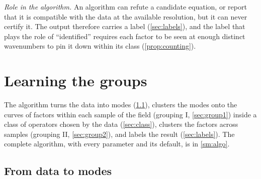 \documentclass[11pt]{article}
\theoremstyle{plain}
\theoremstyle{definition}
\theoremstyle{remark}
\newcommand{\roleinalg}[1]{\par\noindent\emph{Role in the algorithm.} #1\par}
\newcommand{\SMalgo}{\cref{sm:algo}}
\begin{document}
\roleinalg{An algorithm can refute a candidate equation, or report that it is compatible with the data at the available
resolution, but it can never certify it. The output therefore carries a label (\cref{sec:labels}), and the label that
plays the role of ``identified'' requires each factor to be seen at enough distinct wavenumbers to pin it down within
its class (\cref{prop:counting}).}

\section{Learning the groups}\label{sec:algorithm}
The algorithm turns the data into modes (\cref{sec:modes}), clusters the modes onto the curves of factors within each
sample of the field (grouping I, \cref{sec:group1}) inside a class of operators chosen by the data
(\cref{sec:class}), clusters the factors across samples (grouping II, \cref{sec:group2}), and labels the result
(\cref{sec:labels}). The complete algorithm, with every parameter and its default, is in \SMalgo.

\subsection{From data to modes}\label{sec:modes}
\end{document}
